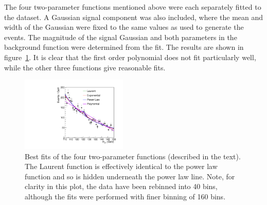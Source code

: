 The four two-parameter functions mentioned above were each
separately fitted to the dataset. A Gaussian signal component was also included, where the
mean and width of the Gaussian were fixed to the same values as used to
generate the events.
The magnitude of the signal Gaussian and both parameters in the
background function were determined from the fit.
The results are shown in figure~\ref{fig:functions:bestfits}.
It is clear that the first order polynomial does not fit particularly well,
while the other three functions give reasonable fits.
%
\begin{figure}[tbp]
\centering
\includegraphics[width=0.45\textwidth]{functions/BestFits.pdf}
\caption{Best fits of the four two-parameter functions (described in the
text).
The Laurent function is effectively identical to the power law function
and so is hidden underneath the power law line.
Note, for clarity in this plot, the
data have been rebinned into 40 bins, although the fits were performed with
finer binning of 160 bins.}
\label{fig:functions:bestfits}
\end{figure}

